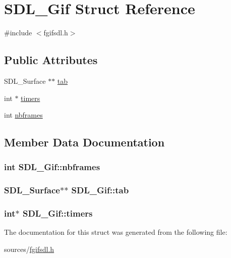 \hypertarget{struct_s_d_l___gif}{\section{S\-D\-L\-\_\-\-Gif Struct Reference}
\label{struct_s_d_l___gif}
}


{\ttfamily \#include $<$fgifsdl.\-h$>$}

\subsection*{Public Attributes}
\begin{DoxyCompactItemize}
\item 
S\-D\-L\-\_\-\-Surface $\ast$$\ast$ \hyperlink{struct_s_d_l___gif_aa2f479f5918cb3bb7d83be12ca71de9e}{tab}
\item 
int $\ast$ \hyperlink{struct_s_d_l___gif_a59eda99245a945a57f681d445fd43725}{timers}
\item 
int \hyperlink{struct_s_d_l___gif_a83b9d5e6a529ccb2aa4ba1393b19be49}{nbframes}
\end{DoxyCompactItemize}


\subsection{Member Data Documentation}
\hypertarget{struct_s_d_l___gif_a83b9d5e6a529ccb2aa4ba1393b19be49}{
\subsubsection[{nbframes}]{\setlength{\rightskip}{0pt plus 5cm}int S\-D\-L\-\_\-\-Gif\-::nbframes}}\label{struct_s_d_l___gif_a83b9d5e6a529ccb2aa4ba1393b19be49}
\hypertarget{struct_s_d_l___gif_aa2f479f5918cb3bb7d83be12ca71de9e}{
\subsubsection[{tab}]{\setlength{\rightskip}{0pt plus 5cm}S\-D\-L\-\_\-\-Surface$\ast$$\ast$ S\-D\-L\-\_\-\-Gif\-::tab}}\label{struct_s_d_l___gif_aa2f479f5918cb3bb7d83be12ca71de9e}
\hypertarget{struct_s_d_l___gif_a59eda99245a945a57f681d445fd43725}{
\subsubsection[{timers}]{\setlength{\rightskip}{0pt plus 5cm}int$\ast$ S\-D\-L\-\_\-\-Gif\-::timers}}\label{struct_s_d_l___gif_a59eda99245a945a57f681d445fd43725}


The documentation for this struct was generated from the following file\-:\begin{DoxyCompactItemize}
\item 
sources/\hyperlink{fgifsdl_8h}{fgifsdl.\-h}\end{DoxyCompactItemize}
